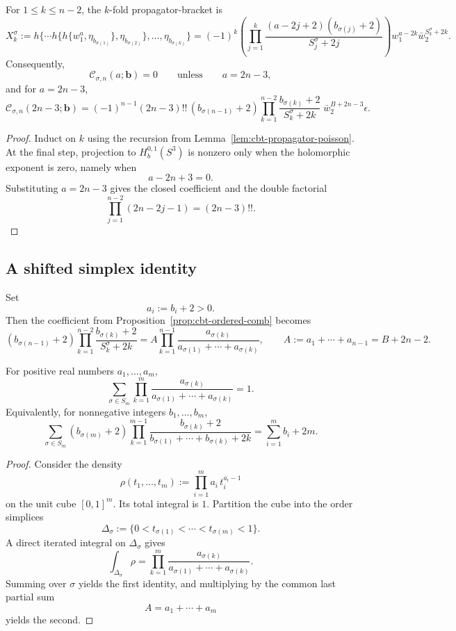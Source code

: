 \begin{proposition}
\label{prop:cbt-ordered-comb}
\ClaimStatusProvedHere
For $1\le k\le n-2$, the $k$-fold propagator-bracket is
\[
X_k^\sigma:=
h\{\cdots h\{h\{w_1^a,\eta_{b_{\sigma(1)}}\},\eta_{b_{\sigma(2)}}\},\dots,\eta_{b_{\sigma(k)}}\}
=
(-1)^k\left(\prod_{j=1}^k
\frac{(a-2j+2)(b_{\sigma(j)}+2)}{S_j^\sigma+2j}
\right)
w_1^{a-2k}\bar w_2^{S_k^\sigma+2k}.
\]
Consequently,
\[
\mathcal C_{\sigma,n}(a;\mathbf b)=0
\qquad\text{unless}\qquad
a=2n-3,
\]
and for $a=2n-3$,
\[
\mathcal C_{\sigma,n}(2n-3;\mathbf b)
=
(-1)^{n-1}(2n-3)!!\,
(b_{\sigma(n-1)}+2)
\prod_{k=1}^{n-2}
\frac{b_{\sigma(k)}+2}{S_k^\sigma+2k}\;
\bar w_2^{B+2n-3}\epsilon.
\]
\end{proposition}

\begin{proof}
Induct on $k$ using the recursion from Lemma~\ref{lem:cbt-propagator-poisson}. At the final step, projection to $H_b^{0,1}(S^3)$ is nonzero only when the holomorphic exponent is zero, namely when
\[
a-2n+3=0.
\]
Substituting $a=2n-3$ gives the closed coefficient and the double factorial
\[
\prod_{j=1}^{n-2}(2n-2j-1)=(2n-3)!!.
\]
\end{proof}

\subsection{A shifted simplex identity}
\label{sec:cbt-shifted-simplex}

Set
\[
a_i:=b_i+2>0.
\]
Then the coefficient from Proposition~\ref{prop:cbt-ordered-comb} becomes
\[
(b_{\sigma(n-1)}+2)\prod_{k=1}^{n-2}
\frac{b_{\sigma(k)}+2}{S_k^\sigma+2k}
=
A\prod_{k=1}^{n-1}
\frac{a_{\sigma(k)}}{a_{\sigma(1)}+\cdots+a_{\sigma(k)}},
\qquad
A:=a_1+\cdots+a_{n-1}=B+2n-2.
\]

\begin{theorem}
\label{thm:cbt-shifted-simplex}
\ClaimStatusProvedHere
For positive real numbers $a_1,\dots,a_m$,
\[
\sum_{\sigma\in S_m}
\prod_{k=1}^{m}
\frac{a_{\sigma(k)}}{a_{\sigma(1)}+\cdots+a_{\sigma(k)}}=1.
\]
Equivalently, for nonnegative integers $b_1,\dots,b_m$,
\[
\sum_{\sigma\in S_m}
(b_{\sigma(m)}+2)\prod_{k=1}^{m-1}
\frac{b_{\sigma(k)}+2}{b_{\sigma(1)}+\cdots+b_{\sigma(k)}+2k}
=
\sum_{i=1}^{m}b_i+2m.
\]
\end{theorem}

\begin{proof}
Consider the density
\[
\rho(t_1,\dots,t_m):=\prod_{i=1}^m a_i\,t_i^{a_i-1}
\]
on the unit cube $[0,1]^m$. Its total integral is $1$. Partition the cube into the order simplices
\[
\Delta_\sigma:=\{0<t_{\sigma(1)}<\cdots<t_{\sigma(m)}<1\}.
\]
A direct iterated integral on $\Delta_\sigma$ gives
\[
\int_{\Delta_\sigma}\rho
=
\prod_{k=1}^{m}
\frac{a_{\sigma(k)}}{a_{\sigma(1)}+\cdots+a_{\sigma(k)}}.
\]
Summing over $\sigma$ yields the first identity, and multiplying by the common last partial sum
\[
A=a_1+\cdots+a_m
\]
yields the second.
\end{proof}

